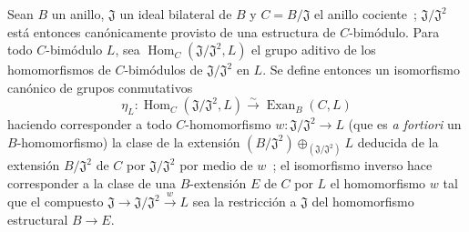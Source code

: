 \begin{proposition}[18.3.8]
\label{0.18.3.8-es}
Sean $B$ un anillo, $\mathfrak J$ un ideal bilateral de $B$ y
$C=B/\mathfrak J$ el anillo cociente~; $\mathfrak J/\mathfrak J^2$ está entonces
canónicamente provisto de una estructura de $C$-bimódulo. Para todo $C$-bimódulo
$L$, sea $\operatorname{Hom}_C(\mathfrak J/\mathfrak J^2,L)$ el grupo
aditivo de los homomorfismos de $C$-bimódulos de $\mathfrak J/\mathfrak J^2$
en $L$. Se define entonces un \textup{isomorfismo} canónico de grupos conmutativos
\begin{equation}
\label{0.18.3.8.1-es}
\tag{18.3.8.1}
  \eta_L:\operatorname{Hom}_C(\mathfrak J/\mathfrak J^2,L)
  \xrightarrow{\sim}\operatorname{Exan}_B(C,L)
\end{equation}
haciendo corresponder a todo $C$-homomorfismo
$w:\mathfrak J/\mathfrak J^2\to L$ \textup{(que es \emph{a fortiori} un
$B$-homomorfismo)} la clase de la extensión
$(B/\mathfrak J^2)\oplus_{(\mathfrak J/\mathfrak J^2)}L$ deducida de
la extensión $B/\mathfrak J^2$ de $C$ por $\mathfrak J/\mathfrak J^2$ por medio
de $w$~; el isomorfismo inverso hace corresponder a la clase de una
$B$-extensión $E$ de $C$ por $L$ el homomorfismo $w$ tal que el compuesto
$\mathfrak J\to\mathfrak J/\mathfrak J^2\xrightarrow{w}L$ sea la restricción
a $\mathfrak J$ del homomorfismo estructural $B\to E$.
\end{proposition}

